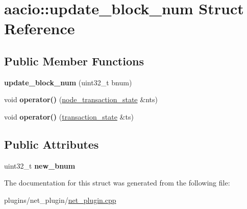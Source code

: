 \hypertarget{structaacio_1_1update__block__num}{}\section{aacio\+:\+:update\+\_\+block\+\_\+num Struct Reference}
\label{structaacio_1_1update__block__num}
\subsection*{Public Member Functions}
\begin{DoxyCompactItemize}
\item 
\mbox{\label{structaacio_1_1update__block__num_a5991a2980e2f2121ed2840bf302ce394}} 
{\bfseries update\+\_\+block\+\_\+num} (uint32\+\_\+t bnum)
\item 
\mbox{\label{structaacio_1_1update__block__num_a91a46324805e4a037fbe7b6b03c06e2c}} 
void {\bfseries operator()} (\mbox{\hyperlink{structaacio_1_1node__transaction__state}{node\+\_\+transaction\+\_\+state}} \&nts)
\item 
\mbox{\label{structaacio_1_1update__block__num_a088716d49129650f5fad835782711d40}} 
void {\bfseries operator()} (\mbox{\hyperlink{structaacio_1_1transaction__state}{transaction\+\_\+state}} \&ts)
\end{DoxyCompactItemize}
\subsection*{Public Attributes}
\begin{DoxyCompactItemize}
\item 
\mbox{\label{structaacio_1_1update__block__num_ab30e9979f0ec556ad3295be6e1877f35}} 
uint32\+\_\+t {\bfseries new\+\_\+bnum}
\end{DoxyCompactItemize}


The documentation for this struct was generated from the following file\+:\begin{DoxyCompactItemize}
\item 
plugins/net\+\_\+plugin/\mbox{\hyperlink{net__plugin_8cpp}{net\+\_\+plugin.\+cpp}}\end{DoxyCompactItemize}
